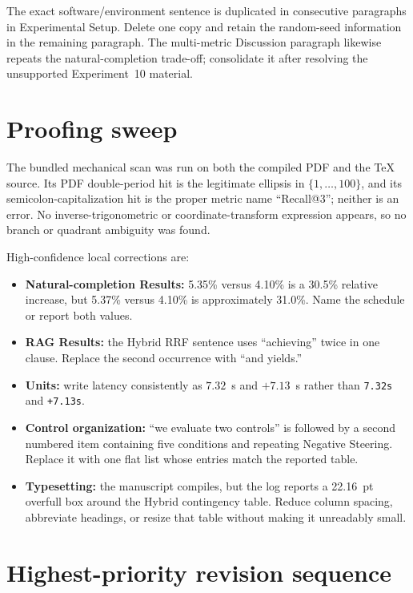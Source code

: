 \documentclass[11pt]{article}
\begin{document}
The exact software/environment sentence is duplicated in consecutive paragraphs in Experimental Setup.  Delete one copy and retain the random-seed information in the remaining paragraph.  The multi-metric Discussion paragraph likewise repeats the natural-completion trade-off; consolidate it after resolving the unsupported Experiment~10 material.

\section*{Proofing sweep}

The bundled mechanical scan was run on both the compiled PDF and the TeX source.  Its PDF double-period hit is the legitimate ellipsis in $\{1,\ldots,100\}$, and its semicolon-capitalization hit is the proper metric name ``Recall@3''; neither is an error.  No inverse-trigonometric or coordinate-transform expression appears, so no branch or quadrant ambiguity was found.

High-confidence local corrections are:

\begin{itemize}
 \item \textbf{Natural-completion Results:} 5.35\% versus 4.10\% is a 30.5\% relative increase, but 5.37\% versus 4.10\% is approximately 31.0\%.  Name the schedule or report both values.
 \item \textbf{RAG Results:} the Hybrid RRF sentence uses ``achieving'' twice in one clause.  Replace the second occurrence with ``and yields.''
 \item \textbf{Units:} write latency consistently as $7.32$~s and $+7.13$~s rather than \texttt{7.32s} and \texttt{+7.13s}.
 \item \textbf{Control organization:} ``we evaluate two controls'' is followed by a second numbered item containing five conditions and repeating Negative Steering.  Replace it with one flat list whose entries match the reported table.
 \item \textbf{Typesetting:} the manuscript compiles, but the log reports a 22.16~pt overfull box around the Hybrid contingency table.  Reduce column spacing, abbreviate headings, or resize that table without making it unreadably small.
\end{itemize}

\section*{Highest-priority revision sequence}
\end{document}
